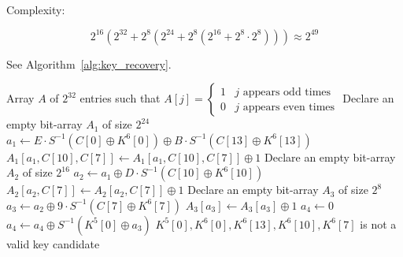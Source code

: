 \documentclass[12pt,journal=tosc, notanonymous]{iacrtrans}
\begin{document}
Complexity: 

$$
2^{16} (2^{32} + 2^8 (2^{24} + 2^8 ( 2^{16} + 2^8 \cdot 2^8 ) ) )  \approx 2^{49} 
$$

See Algorithm~\ref{alg:key_recovery}.

\begin{algorithm}
\caption{Partial-sum algorithm for key recovery.}
\label{alg:key_recovery}
\begin{algorithmic}[1] %
    \REQUIRE Array $A$ of $2^{32}$ entries such that $A[j] =
    \begin{cases}
    1 & j \mbox{ appears odd times} \\
    0 & j \mbox{ appears even times}
    \end{cases}$
        \STATE Declare an empty bit-array $A_1$ of size $2^{24}$
                \STATE $a_1 \leftarrow E \cdot S^{-1}(C[0] \oplus K^6[0]) \oplus B \cdot S^{-1}( C[13] \oplus K^{6}[13])$
                \STATE $A_1[a_1, C[10], C[7]] \leftarrow A_1[a_1,C[10], C[7]] \oplus 1$
            \ENDIF
        \ENDFOR
            \STATE Declare an empty bit-array $A_2$ of size $2^{16}$
                    \STATE $a_2 \leftarrow a_1 \oplus D \cdot S^{-1}(C[10] \oplus K^{6}[10])$
                    \STATE $A_2[a_2, C[7]] \leftarrow A_2[a_2,C[7]] \oplus 1$
                \ENDIF
            \ENDFOR
                \STATE Declare an empty bit-array $A_3$ of size $2^{8}$
                        \STATE $a_3 \leftarrow a_2 \oplus 9 \cdot S^{-1}(C[7] \oplus K^6[7])$
                        \STATE $A_3[a_3] \leftarrow A_3[a_3] \oplus 1$
                    \ENDIF
                \ENDFOR
                    \STATE $a_4 \leftarrow 0$
                            \STATE $a_4 \leftarrow a_4 \oplus S^{-1}(K^5[0] \oplus a_3)$
                        \ENDIF
                    \ENDFOR
                        \STATE $K^5[0], K^6[0], K^6[13], K^6[10], K^6[7]$ is not a valid key candidate
                    \ENDIF
                \ENDFOR
            \ENDFOR
        \ENDFOR
    \ENDFOR
\end{algorithmic}
\end{algorithm}
\end{document}
